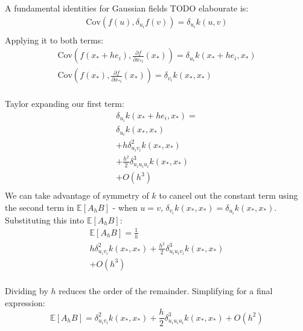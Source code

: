 A fundamental identities for Gaussian fields TODO elabourate is:
\begin{equation*}
    \begin{aligned}
        \text{Cov}(f(u), \delta_{u_i} f(v)) = \delta_{u_i} k(u, v) \\
    \end{aligned}
\end{equation*}
Applying it to both terms:
\begin{equation*}
    \begin{aligned}
        \text{Cov}(f(x_* + h e_i), \frac{\partial f}{\partial x_{*i}}(x_*)) = \delta_{u_i} k(x_* + h e_i, x_*) \\
        \text{Cov}(f(x_*), \frac{\partial f}{\partial x_{*i}}(x_*)) = \delta_{v_i} k(x_*, x_*) \\
    \end{aligned}
\end{equation*}

Taylor expanding our first term:
\begin{equation*}
    \begin{aligned}
        \delta_{u_i} k(x_* + h e_i, x_*) = \\
        \delta_{u_i} k(x_*, x_*) \\
        + h \delta_{u_i v_i}^2 k(x_*, x_*) \\
        + \frac{h^2}{2} \delta_{u_i u_i u_i}^3 k(x_*, x_*) \\
        + O(h^3) \\
    \end{aligned}
\end{equation*}
We can take advantage of symmetry of $k$ to cancel out the constant term using the second term in $\mathbb{E}[A_hB]$ - when $u = v$, $\delta_{v_i} k(x_*, x_*) = \delta_{u_i} k(x_*, x_*)$. Substituting this into $\mathbb{E}[A_h B]$:
\begin{equation*}
    \begin{aligned}
        \mathbb{E}[A_h B] = \frac{1}{h} \\
        h \delta_{u_i v_i}^2 k(x_*, x_*)
        + \frac{h^2}{2} \delta_{u_i u_i v_i}^3 k(x_*, x_*) \\
        + O(h^3) \\
    \end{aligned}
\end{equation*}

Dividing by $h$ reduces the order of the remainder. Simplifying for a final expression:
\begin{equation} \label{eq:msd_ab_final}
    \mathbb{E}[A_h B] = \delta_{u_i v_i}^2 k(x_*, x_*) + \frac{h}{2} \delta_{u_i u_i u_i}^3 k(x_*, x_*) + O(h^2)
\end{equation}

